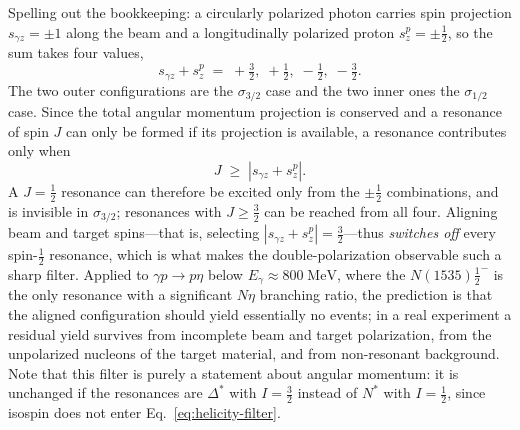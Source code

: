 Spelling out the bookkeeping: a circularly polarized photon carries spin projection
$s_{\gamma z} = \pm 1$ along the beam and a longitudinally polarized proton
$s_{z}^{p} = \pm\tfrac12$, so the sum takes four values,
\begin{equation}
    s_{\gamma z} + s_{z}^{p} \;=\; +\tfrac32,\; +\tfrac12,\; -\tfrac12,\; -\tfrac32 .
    \label{eq:helicity-sum}
\end{equation}
The two outer configurations are the $\sigma_{3/2}$ case and the two inner ones the
$\sigma_{1/2}$ case. Since the total angular momentum projection is conserved and a
resonance of spin $J$ can only be formed if its projection is available, a resonance
contributes only when
\begin{equation}
    J \;\ge\; \left| s_{\gamma z} + s_{z}^{p} \right| .
    \label{eq:helicity-filter}
\end{equation}
A $J=\tfrac12$ resonance can therefore be excited only from the $\pm\tfrac12$
combinations, and is invisible in $\sigma_{3/2}$; resonances with $J\ge\tfrac32$ can be
reached from all four. Aligning beam and target spins---that is, selecting
$|s_{\gamma z}+s_{z}^{p}| = \tfrac32$---thus \emph{switches off} every spin-$\tfrac12$
resonance, which is what makes the double-polarization observable such a sharp filter.
Applied to $\gamma p \to p\eta$ below $E_{\gamma} \approx 800\;\mathrm{MeV}$, where the
$N(1535)\tfrac12^{-}$ is the only resonance with a significant $N\eta$ branching ratio,
the prediction is that the aligned configuration should yield essentially no events; in a
real experiment a residual yield survives from incomplete beam and target polarization,
from the unpolarized nucleons of the target material, and from non-resonant background.
Note that this filter is purely a statement about angular momentum: it is unchanged if the
resonances are $\Delta^{*}$ with $I=\tfrac32$ instead of $N^{*}$ with $I=\tfrac12$, since
isospin does not enter Eq.~\eqref{eq:helicity-filter}.


